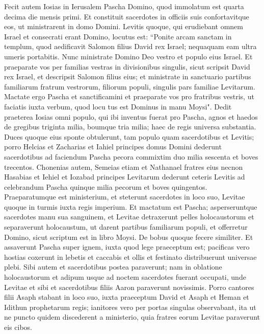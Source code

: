 \begin{biblechapter}  
\verse Fecit autem Iosias in Ierusalem Pascha Domino, quod immolatum est quarta decima die mensis primi. 
\verse Et constituit sacerdotes in officiis suis confortavitque eos, ut ministrarent in domo Domini. 
\verse Levitis quoque, qui erudiebant omnem Israel et consecrati erant Domino, locutus est: “Ponite arcam sanctam in templum, quod aedificavit Salomon filius David rex Israel; nequaquam eam ultra umeris portabitis. Nunc ministrate Domino Deo vestro et populo eius Israel. 
\verse Et praeparate vos per familias vestras in divisionibus singulis, sicut scripsit David rex Israel, et descripsit Salomon filius eius; 
\verse et ministrate in sanctuario partibus familiarum fratrum vestrorum, filiorum populi, singulis pars familiae Levitarum. 
\verse Mactate ergo Pascha et sanctificamini et praeparate vos pro fratribus vestris, ut faciatis iuxta verbum, quod locu tus est Dominus in manu Moysi". 
\verse Dedit praeterea Iosias omni populo, qui ibi inventus fuerat pro Pascha, agnos et haedos de gregibus triginta milia, boumque tria milia; haec de regis universa substantia. 
\verse Duces quoque eius sponte obtulerunt, tam populo quam sacerdotibus et Levitis; porro Helcias et Zacharias et Iahiel principes domus Domini dederunt sacerdotibus ad faciendum Pascha pecora commixtim duo milia sescenta et boves trecentos. 
\verse Chonenias autem, Semeias etiam et Nathanael fratres eius necnon Hasabias et Iehiel et Iozabad principes Levitarum dederunt ceteris Levitis ad celebrandum Pascha quinque milia pecorum et boves quingentos. 
\verse Praeparatumque est ministerium, et steterunt sacerdotes in loco suo, Levitae quoque in turmis iuxta regis imperium. 
\verse Et mactatum est Pascha; asperseruntque sacerdotes manu sua sanguinem, et Levitae detraxerunt pelles holocaustorum 
\verse et separaverunt holocaustum, ut darent partibus familiarum populi, et offerretur Domino, sicut scriptum est in libro Moysi. De bobus quoque fecere similiter. 
\verse Et assaverunt Pascha super ignem, iuxta quod lege praeceptum est; pacificas vero hostias coxerunt in lebetis et caccabis et ollis et festinato distribuerunt universae plebi. 
\verse Sibi autem et sacerdotibus postea paraverunt; nam in oblatione holocaustorum et adipum usque ad noctem sacerdotes fuerant occupati, unde Levitae et sibi et sacerdotibus filiis Aaron paraverunt novissimis. 
\verse Porro cantores filii Asaph stabant in loco suo, iuxta praeceptum David et Asaph et Heman et Idithun prophetarum regis; ianitores vero per portas singulas observabant, ita ut ne puncto quidem discederent a ministerio, quia fratres eorum Levitae paraverunt eis cibos. 

\end{biblechapter}
